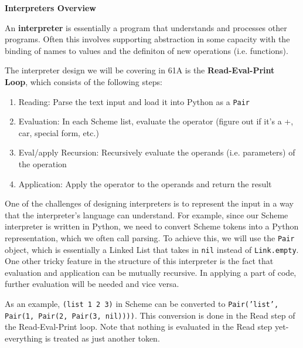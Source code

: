 \textbf{Interpreters Overview} 

An \textbf{interpreter} is essentially a program that understands and processes other programs. Often this involves supporting abstraction in some capacity with the binding of names to values and the definiton of new operations (i.e. functions).

The interpreter design we will be covering in 61A is the \textbf{Read-Eval-Print Loop}, which consists of the following steps:
\begin{enumerate}
    \item Reading: Parse the text input and load it into Python as a \texttt{Pair}
    \item Evaluation: In each Scheme list, evaluate the operator (figure out if it's a +, car, special form, etc.)
    \item Eval/apply Recursion: Recursively evaluate the operands (i.e. parameters) of the operation
    \item Application: Apply the operator to the operands and return the result
\end{enumerate}

One of the challenges of designing interpreters is to represent the input in a way that the interpreter's language can understand.
For example, since our Scheme interpreter is written in Python, we need to convert Scheme tokens into a Python representation, which we often call parsing.
To achieve this, we will use the \texttt{Pair} object, which is essentially a Linked List that takes in \texttt{nil} instead of \texttt{Link.empty}.
One other tricky feature in the structure of this interpreter is the fact that evaluation and application can be mutually recursive. In applying a part of code, further evaluation will be needed and vice versa.

As an example, \texttt{(list 1 2 3)} in Scheme can be converted to \texttt{Pair('list', Pair(1, Pair(2, Pair(3, nil))))}.
This conversion is done in the Read step of the Read-Eval-Print loop. Note that nothing is evaluated in the Read step yet- everything is treated as just another token.
